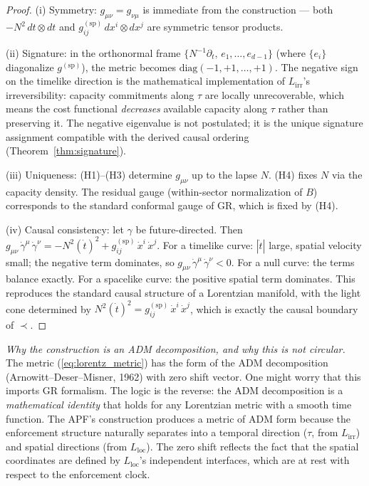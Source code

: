 \documentclass[11pt,a4paper]{article}
\theoremstyle{definition}
\begin{document}
\begin{proof}
(i) Symmetry: $g_{\mu\nu} = g_{\nu\mu}$ is immediate from the
construction --- both $-N^2\,dt \otimes dt$ and
$g_{ij}^{(\mathrm{sp})}\,dx^i \otimes dx^j$ are symmetric tensor
products.

(ii) Signature: in the orthonormal frame $\{N^{-1}\partial_t,\,
e_1, \ldots, e_{d-1}\}$ (where $\{e_i\}$ diagonalize
$g^{(\mathrm{sp})}$), the metric becomes
$\mathrm{diag}(-1, +1, \ldots, +1)$.  The negative sign on the
timelike direction is the mathematical implementation of
$L_{\mathrm{irr}}$'s irreversibility: capacity commitments along
$\tau$ are locally unrecoverable, which means the cost functional
\emph{decreases} available capacity along $\tau$ rather than
preserving it.  The negative eigenvalue is not postulated; it is the
unique signature assignment compatible with the derived causal
ordering (Theorem~\ref{thm:signature}).

(iii) Uniqueness: (H1)--(H3) determine $g_{\mu\nu}$ up to the lapse
$N$.  (H4) fixes $N$ via the capacity density.  The residual gauge
(within-sector normalization of $B$) corresponds to the standard
conformal gauge of GR, which is fixed by (H4).

(iv) Causal consistency: let $\gamma$ be future-directed.  Then
$g_{\mu\nu}\,\dot{\gamma}^\mu\,\dot{\gamma}^\nu =
-N^2 (\dot{t})^2 + g_{ij}^{(\mathrm{sp})}\,\dot{x}^i\,\dot{x}^j$.
For a timelike curve: $|\dot{t}|$ large, spatial velocity small;
the negative term dominates, so
$g_{\mu\nu}\,\dot{\gamma}^\mu\,\dot{\gamma}^\nu < 0$.  For a
null curve: the terms balance exactly.  For a spacelike curve:
the positive spatial term dominates.  This reproduces the standard
causal structure of a Lorentzian manifold, with the light cone
determined by $N^2 (\dot{t})^2 = g_{ij}^{(\mathrm{sp})}\,\dot{x}^i\,
\dot{x}^j$, which is exactly the causal boundary of $\prec$.
\end{proof}

\smallskip\noindent\textit{Why the construction is an ADM
decomposition, and why this is not circular.}\quad
The metric (\ref{eq:lorentz_metric}) has the form of the ADM
decomposition (Arnowitt--Deser--Misner, 1962) with zero shift vector.
One might worry that this imports GR formalism.  The logic is the
reverse: the ADM decomposition is a \emph{mathematical identity}
that holds for any Lorentzian metric with a smooth time function.
The APF's construction produces a metric of ADM form because the
enforcement structure naturally separates into a temporal direction
($\tau$, from $L_{\mathrm{irr}}$) and spatial directions (from
$L_{\mathrm{loc}}$).  The zero shift reflects the fact that the
spatial coordinates are defined by $L_{\mathrm{loc}}$'s independent
interfaces, which are at rest with respect to the enforcement clock.
\end{document}

